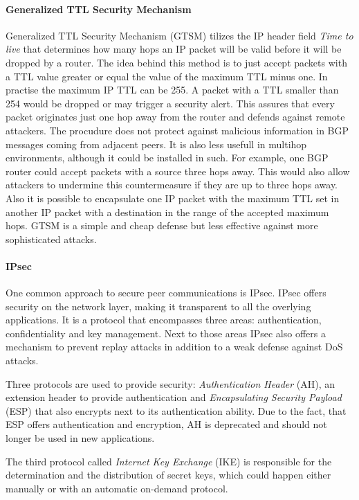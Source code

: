 \documentclass[12pt,a4paper]{IEEEtran}
\begin{document}
		\paragraph{Generalized TTL Security Mechanism}
		Generalized TTL Security Mechanism (GTSM) tilizes the IP header field \emph{Time to live} that determines how many hops an IP packet will be valid before it will be dropped by a router. The idea behind this method is to just accept packets with a TTL value greater or equal the value of the maximum TTL minus one\citep{Gill2004}. In practise the maximum IP TTL can be 255. A packet with a TTL smaller than 254 would be dropped or may trigger a security alert. This assures that every packet originates just one hop away from the router and defends against remote attackers. The procudure does not protect against malicious information in BGP messages coming from adjacent peers. It is also less usefull in multihop environments, although it could be installed in such. For example, one BGP router could accept packets with a source three hops away. This would also allow attackers to undermine this countermeasure if they are up to three hops away. Also it is possible to encapsulate one IP packet with the maximum TTL set in another IP packet with a destination in the range of the accepted maximum hops. GTSM is a simple and cheap defense but less effective against more sophisticated attacks. 
	
		\paragraph{IPsec}	
		One common approach to secure peer communications is IPsec. IPsec offers security on the network layer, making it transparent to all the overlying applications. It is a protocol that encompasses three areas: authentication, confidentiality and key management. Next to those areas IPsec also offers a mechanism to prevent replay attacks in addition to a weak defense against DoS attacks.

		Three protocols are used to provide security: \emph{Authentication Header}\citep{Atkinson1995a} (AH), an extension header to provide authentication and \emph{Encapsulating Security Payload}\citep{Atkinson1995} (ESP) that also encrypts next to its authentication ability. Due to the fact, that ESP offers authentication and encryption, AH is deprecated and should not longer be used in new applications. 
		
		The third protocol called \emph{Internet Key Exchange} \citep{Sheffer2010} (IKE) is responsible for the determination and the distribution of secret keys, which could happen either manually or with an automatic on-demand protocol.
\end{document}
